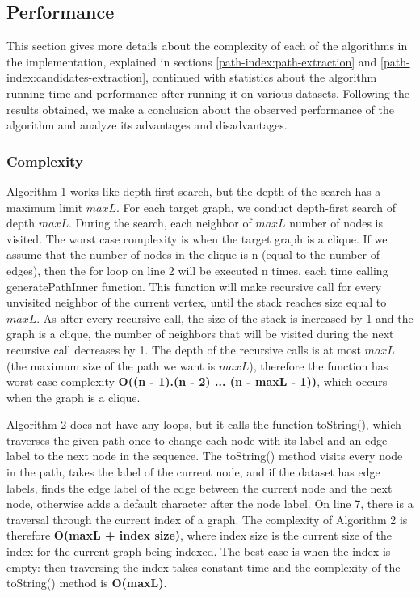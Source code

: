 \documentclass{l4proj}
\begin{document}
\subsection{Performance}
This section gives more details about the complexity of each of the algorithms in the implementation, explained in sections \ref{path-index:path-extraction} and \ref{path-index:candidates-extraction}, continued with statistics about the algorithm running time and performance after running it on various datasets. Following the results obtained, we make a conclusion about the observed performance of the algorithm and analyze its advantages and disadvantages.\par
\subsubsection{Complexity}
\label{path-index:complexity}
Algorithm 1 works like depth-first search, but the depth of the search has a maximum limit $maxL$. For each target graph, we conduct depth-first search of depth $maxL$. During the search, each neighbor of $maxL$ number of nodes is visited. The worst case complexity is when the target graph is a clique. If we assume that the number of nodes in the clique is n (equal to the number of edges), then the for loop on line 2 will be executed n times, each time calling \textrm{generatePathInner} function. This function will make recursive call for every unvisited neighbor of the current vertex, until the stack reaches size equal to $maxL$. As after every recursive call, the size of the stack is increased by 1 and the graph is a clique, the number of neighbors that will be visited during the next recursive call decreases by 1. The depth of the recursive calls is at most $maxL$ (the maximum size of the path we want  is $maxL$), therefore the function has worst case complexity \textbf{O((n - 1).(n - 2) ... (n - maxL - 1))}, which occurs when the graph is a clique. \par
 Algorithm 2 does not have any loops, but it calls the function \textrm{toString()}, which traverses the given path once to change each node with its label and an edge label to the next node in the sequence. The \textrm{toString()} method visits every node in the path, takes the label of the current node, and if the dataset has edge labels, finds the edge label of the edge between the current node and the next node, otherwise adds a default character after the node label. On line 7, there is a traversal through the current index of a graph. The complexity of Algorithm 2 is therefore \textbf{O(maxL + index size)}, where index size is the current size of the index for the current graph being indexed. The best case is when the index is empty: then traversing the index takes constant time and the complexity of the \textrm{toString()} method is \textbf{O(maxL)}.\par
\end{document}
